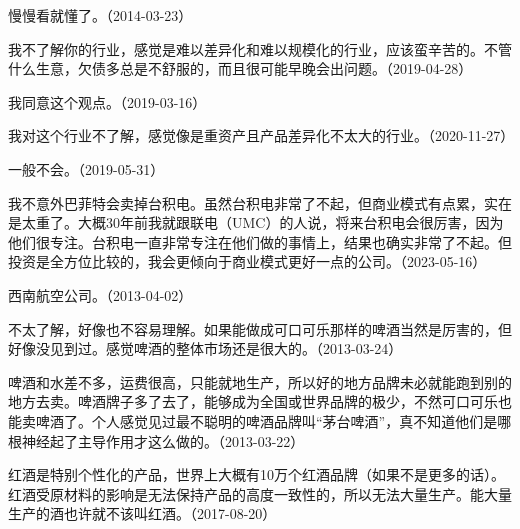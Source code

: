 
慢慢看就懂了。（2014-03-23）


我不了解你的行业，感觉是难以差异化和难以规模化的行业，应该蛮辛苦的。不管什么生意，欠债多总是不舒服的，而且很可能早晚会出问题。（2019-04-28）


我同意这个观点。（2019-03-16）


我对这个行业不了解，感觉像是重资产且产品差异化不太大的行业。（2020-11-27）


一般不会。（2019-05-31）


我不意外巴菲特会卖掉台积电。虽然台积电非常了不起，但商业模式有点累，实在是太重了。大概30年前我就跟联电（UMC）的人说，将来台积电会很厉害，因为他们很专注。台积电一直非常专注在他们做的事情上，结果也确实非常了不起。但投资是全方位比较的，我会更倾向于商业模式更好一点的公司。（2023-05-16）


西南航空公司。（2013-04-02）


不太了解，好像也不容易理解。如果能做成可口可乐那样的啤酒当然是厉害的，但好像没见到过。感觉啤酒的整体市场还是很大的。（2013-03-24）

啤酒和水差不多，运费很高，只能就地生产，所以好的地方品牌未必就能跑到别的地方去卖。啤酒牌子多了去了，能够成为全国或世界品牌的极少，不然可口可乐也能卖啤酒了。个人感觉见过最不聪明的啤酒品牌叫“茅台啤酒”，真不知道他们是哪根神经起了主导作用才这么做的。（2013-03-22）


红酒是特别个性化的产品，世界上大概有10万个红酒品牌（如果不是更多的话）。红酒受原材料的影响是无法保持产品的高度一致性的，所以无法大量生产。能大量生产的酒也许就不该叫红酒。（2017-08-20）

